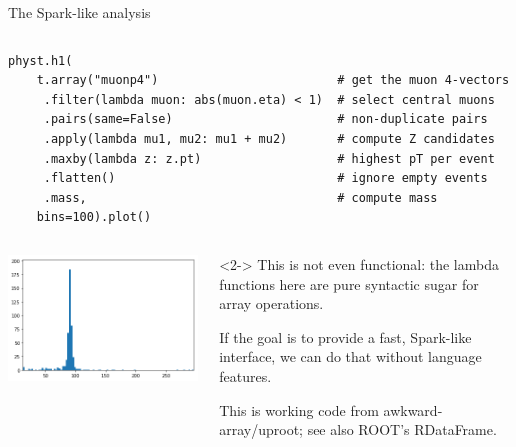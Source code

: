 \documentclass[aspectratio=169]{beamer}
\begin{document}
\begin{frame}[fragile]{The Spark-like analysis}
\small
\begin{columns}
\begin{verbatim}
physt.h1(
    t.array("muonp4")                         # get the muon 4-vectors
     .filter(lambda muon: abs(muon.eta) < 1)  # select central muons
     .pairs(same=False)                       # non-duplicate pairs
     .apply(lambda mu1, mu2: mu1 + mu2)       # compute Z candidates
     .maxby(lambda z: z.pt)                   # highest pT per event
     .flatten()                               # ignore empty events
     .mass,                                   # compute mass
    bins=100).plot()
\end{verbatim}
\end{columns}

\vspace{0.25 cm}
\begin{columns}
\includegraphics[width=\linewidth]{zpeak.png}

\begin{uncoverenv}<2->
\normalsize
\hspace{-0.15 cm}This is not even functional: the lambda functions here are pure syntactic sugar for array operations.

\vspace{0.25 cm}
If the goal is to provide a fast, Spark-like interface, we can do that without language features.

\vspace{0.25 cm}
This is working code from awkward-array/uproot; see also ROOT's RDataFrame.

\mbox{ }
\end{uncoverenv}
\end{columns}
\end{frame}
\end{document}
